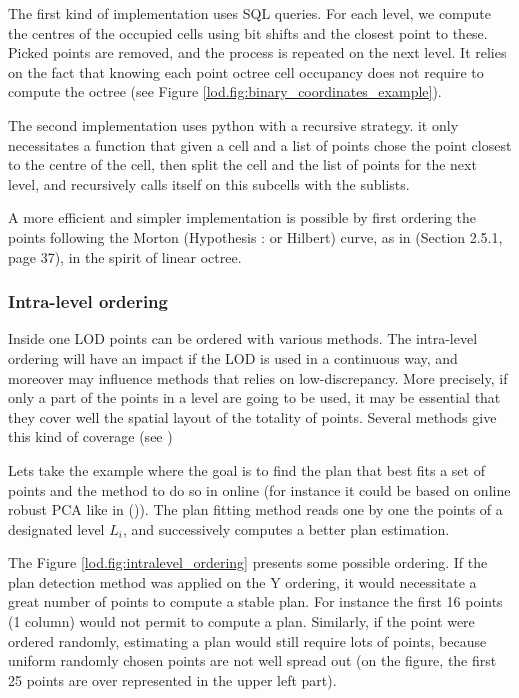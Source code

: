 		The first kind of implementation uses SQL queries. For each level, we compute the centres of the occupied cells using bit shifts and the closest point to these. Picked points are removed, and the process is repeated on the next level.
		It relies on the fact that knowing each point octree cell occupancy does not require to compute the octree (see Figure \ref{lod.fig:binary_coordinates_example}).
		
		The second implementation uses python with a recursive strategy. it only necessitates a function that given a cell and a list of points chose the point closest to the centre of the cell, then split the cell and the list of points for the next level, and recursively calls itself on this subcells with the sublists.
		
		A more efficient and simpler implementation is possible by first ordering the points following the Morton (Hypothesis : or Hilbert) curve, as  in \cite{Feng2014} (Section 2.5.1, page 37), in the spirit of linear octree.
		
		\subsubsection{Intra-level ordering}
		\label{lod.method.intralevel}
		
		
		Inside one LOD points can be ordered with various methods.
		The intra-level ordering will have an impact if the LOD is used in a continuous way,
		and moreover may influence methods that relies on low-discrepancy.
		More precisely, if only a part of the points in a level are going to be used,
		it may be essential that they cover well the spatial layout of the totality of points.
		Several methods give this kind of coverage (see \cite{Rainville2012})
		
		Lets take the example where the goal is to find the plan that best fits a set of points
		and the method to do so in online (for instance it could be based on online robust PCA like in (\cite{Feng2013})).
		The plan fitting method reads one by one the points of a designated level $L_i$, and successively computes a better plan estimation.
		
		The Figure \ref{lod.fig:intralevel_ordering} presents some possible ordering. 
		If the plan detection method was applied on the Y ordering, it would necessitate a great number of points to compute a stable plan. For instance the first 16 points (1 column) would not permit to compute a plan.
		Similarly, if the point were ordered randomly, estimating a plan would still require lots of points, because uniform randomly chosen points are not well spread out (on the figure, the first 25 points are over represented in the upper left part).
		
